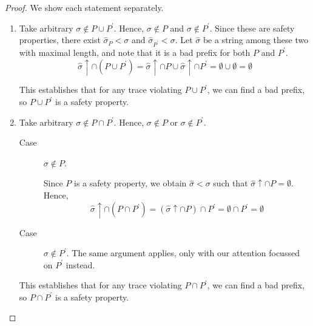 \documentclass[letterpaper,11pt]{article}
\newcommand{\union}{\cup}
\newcommand{\intersn}{\cap}
\newcommand{\up}{\uparrow}
\begin{document}
\begin{proof}
    We show each statement separately.

    \begin{enumerate}
        \item
            Take arbitrary $\sigma \notin P \union P^\prime$. Hence,
            $\sigma \notin P$ and $\sigma \notin P^\prime$. Since these are
            safety properties, there exist $\hat \sigma_P < \sigma$ and
            $\hat \sigma_{P^\prime} < \sigma$. Let $\hat \sigma$ be a
            string among these two with maximal length, and note that it is a
            bad prefix for both $P$ and $P^\prime$.
            \begin{equation*}
                \hat \sigma \up \intersn (P \union P^\prime)
                = \hat \sigma \up \intersn P
                \union \hat \sigma \up \intersn P^\prime
                = \emptyset \union \emptyset
                = \emptyset
            \end{equation*}

            This establishes that for any trace violating $P \union P^\prime$,
            we can find a bad prefix, so $P \union P^\prime$ is a safety
            property.

        \item
            Take arbitrary $\sigma \notin P \intersn P^\prime$.
            Hence, $\sigma \notin P$ or $\sigma \notin P^\prime$.
            \begin{description}
                \item[Case] $\sigma \notin P$.

                    Since $P$ is a safety property, we obtain
                    $\hat \sigma < \sigma$ such that
                    $\hat \sigma \up \intersn P = \emptyset$.
                    Hence,
                    \begin{equation*}
                        \hat \sigma \up \intersn (P \intersn P^\prime)
                        = (\hat \sigma \up \intersn P) \intersn P^\prime
                        = \emptyset \intersn P^\prime
                        = \emptyset
                    \end{equation*}

                \item[Case] $\sigma \notin P^\prime$. The same argument
                    applies, only with our attention focussed on $P^\prime$
                    instead.
            \end{description}

            This establishes that for any trace violating
            $P \intersn P^\prime$, we can find a bad prefix, so
            $P \intersn P^\prime$ is a safety property.
    \end{enumerate}
\end{proof}
\end{document}
